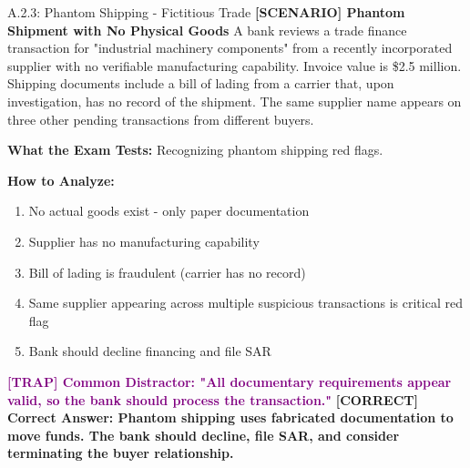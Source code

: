 \documentclass[11pt,a4paper]{beamer}
\newcommand{\trap}[1]{\textcolor{purple}{\textbf{[TRAP] #1}}}
\newcommand{\correct}[1]{\textcolor{green!50!black}{\textbf{[CORRECT] #1}}}
\newcommand{\scenario}[1]{\textcolor{blue!70!black}{\textbf{[SCENARIO] #1}}}
\begin{document}
	\begin{frame}{A.2.3: Phantom Shipping - Fictitious Trade}
		\scenario{Phantom Shipment with No Physical Goods}
		A bank reviews a trade finance transaction for "industrial machinery components" from a recently incorporated supplier with no verifiable manufacturing capability. Invoice value is \$2.5 million. Shipping documents include a bill of lading from a carrier that, upon investigation, has no record of the shipment. The same supplier name appears on three other pending transactions from different buyers.
		
		\vspace{0.1cm}
		\textbf{What the Exam Tests:} Recognizing phantom shipping red flags.
		
		\vspace{0.1cm}
		\textbf{How to Analyze:}
		\begin{enumerate}
			\item No actual goods exist - only paper documentation
			\item Supplier has no manufacturing capability
			\item Bill of lading is fraudulent (carrier has no record)
			\item Same supplier appearing across multiple suspicious transactions is critical red flag
			\item Bank should decline financing and file SAR
		\end{enumerate}
		
		\trap{Common Distractor: "All documentary requirements appear valid, so the bank should process the transaction."}
		\correct{Correct Answer: Phantom shipping uses fabricated documentation to move funds. The bank should decline, file SAR, and consider terminating the buyer relationship.}
	\end{frame}
	
\end{document}
